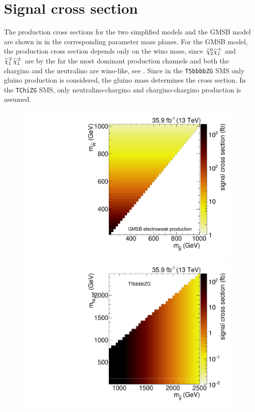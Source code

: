 \section*{Signal cross section}
The production cross sections for the two simplified models and the GMSB model are shown in  in the corresponding parameter mass planes. For the GMSB model, the production cross section depends only on the wino mass, since $\widetilde{\chi}^{0}_{2}\widetilde{\chi}^\pm_{1}$ and $\widetilde{\chi}^\mp_{1}\widetilde{\chi}^\pm_{1}$ are by the far the most dominant production channels and both the chargino and the neutralino are wino-like, see . Since in the \texttt{T5bbbbZG} SMS only gluino production is considered, the gluino mass determines the cross section. In the \texttt{TChiZG} SMS, only neutralino-chargino and chargino-chargino production is assumed.
\begin{figure}
 \centering
 \includegraphics[width=\pairwidth]{figures/acceptance/GMSB_xsec_log}
 \includegraphics[width=\pairwidth]{figures/acceptance/T5bbbbZg_xsec_log}

\end{figure}
